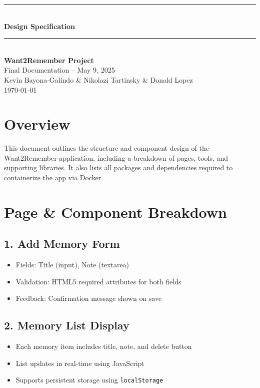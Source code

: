 \documentclass[12pt]{article}
\begin{document}
\begin{titlepage}
    \newcommand{\HRule}{\rule{\linewidth}{0.5mm}} 
    \vspace*{\fill}
    \begin{center}
        \HRule \\[0.5cm]
        {\Huge \bfseries Design Specification \\[0.4cm]}
        \HRule \\[1.5cm]
        {\LARGE \textbf{Want2Remember Project}}\\[0.5cm]
        {\Large Final Documentation – May 9, 2025}\\[2cm]
        {\Large Kevin Bayona-Galindo \& Nikolazi Tartinsky \& Donald Lopez}\\[0.5cm]
        {\large \today}
    \end{center}
    \vspace*{\fill}
\end{titlepage}

\tableofcontents
\newpage

\section{Overview}
This document outlines the structure and component design of the Want2Remember application, including a breakdown of pages, tools, and supporting libraries. It also lists all packages and dependencies required to containerize the app via Docker.

\section{Page \& Component Breakdown}

\subsection*{1. Add Memory Form}
\begin{itemize}
  \item Fields: Title (input), Note (textarea)
  \item Validation: HTML5 required attributes for both fields
  \item Feedback: Confirmation message shown on save
\end{itemize}

\subsection*{2. Memory List Display}
\begin{itemize}
  \item Each memory item includes title, note, and delete button
  \item List updates in real-time using JavaScript
  \item Supports persistent storage using \texttt{localStorage}
\end{itemize}
\end{document}
